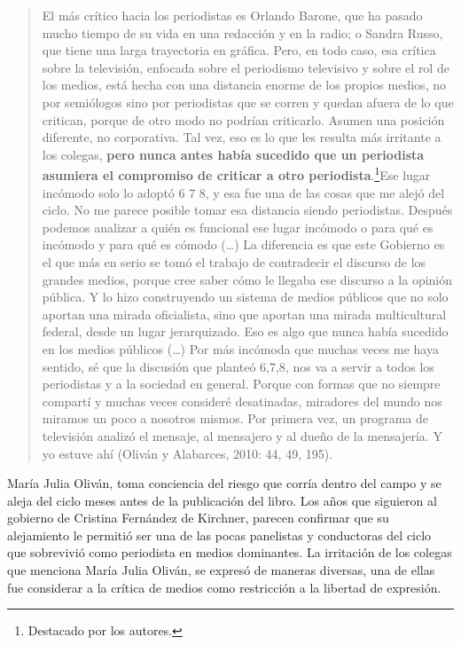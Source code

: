 \begin{quote}
El más crítico hacia los periodistas es Orlando Barone, que ha pasado mucho tiempo de su vida en una redacción y en la radio; o Sandra Russo, que tiene una larga trayectoria en gráfica. Pero, en todo caso, esa crítica sobre la televisión, enfocada sobre el periodismo televisivo y sobre el rol de los medios, está hecha con una distancia enorme de los propios medios, no por semiólogos sino por periodistas que se corren y quedan afuera de lo que critican, porque de otro modo no podrían criticarlo. Asumen una posición diferente, no corporativa. Tal vez, eso es lo que les resulta más irritante a los colegas, \textbf{pero nunca antes había sucedido que un periodista asumiera el compromiso de criticar a otro periodista}.\footnote{Destacado por los autores.}Ese lugar incómodo solo lo adoptó 6 7 8, y esa fue una de las cosas que me alejó del ciclo. No me parece posible tomar esa distancia siendo periodistas. Después podemos analizar a quién es funcional ese lugar incómodo o para qué es incómodo y para qué es cómodo (\ldots) La diferencia es que este Gobierno es el que más en serio se tomó el trabajo de contradecir el discurso de los grandes medios, porque cree saber cómo le llegaba ese discurso a la opinión pública. Y lo hizo construyendo un sistema de medios públicos que no solo aportan una mirada oficialista, sino que aportan una mirada multicultural federal, desde un lugar jerarquizado. Eso es algo que nunca había sucedido en los medios públicos (\ldots) Por más incómoda que muchas veces me haya sentido, sé que la discusión que planteó 6,7,8, nos va a servir a todos los periodistas y a la sociedad en general. Porque con formas que no siempre compartí y muchas veces consideré desatinadas, miradores del mundo nos miramos un poco a nosotros mismos. Por primera vez, un programa de televisión analizó el mensaje, al mensajero y al dueño de la mensajería. Y yo estuve ahí (Oliván y Alabarces, 2010: 44, 49, 195).
\end{quote}

María Julia Oliván, toma conciencia del riesgo que corría dentro del campo y se aleja del ciclo meses antes de la publicación del libro. Los años que siguieron al gobierno de Cristina Fernández de Kirchner, parecen confirmar que su alejamiento le permitió ser una de las pocas panelistas y conductoras del ciclo que sobrevivió como periodista en medios dominantes. La irritación de los colegas que menciona María Julia Oliván, se expresó de maneras diversas, una de ellas fue considerar a la crítica de medios como restricción a la libertad de expresión.

